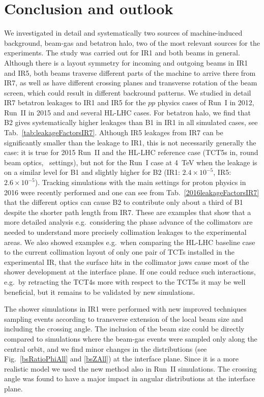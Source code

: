 \section{Conclusion and outlook~\label{last}}

We investigated in detail and systematically two sources of machine-induced background, beam-gas and betatron halo, two of the most relevant sources for the experiments. The study was carried out for IR1 and both beams in general. Although there is a layout symmetry for incoming and outgoing beams in IR1 and IR5, both beams traverse different parts of the machine to arrive there from IR7, as well as have different crossing planes and transverse rotation of the beam screen, which could result in different backround patterns. We studied in detail IR7 betatron leakages to IR1 and IR5 for the $pp$ physics cases of Run~I in 2012, Run~II in 2015 and and several HL-LHC cases. For betatron halo, we find that B2 gives systematically higher leakages than B1 in IR1 in all simulated cases, see Tab.~\ref{tab:leakageFactorsIR7}. Although IR5 leakages from IR7 can be significantly smaller than the leakage to IR1, this is not necessarily generally the case: it is true for 2015 Run~II and the HL-LHC reference case (TCT5s in, round beam optics, \twosigmaret~settings), but not for the Run~I case at 4~TeV when the leakage is on a similar level for B1 and slightly higher for B2 (IR1: $2.4 \times 10^{-5}$, IR5: $2.6 \times 10^{-5}$). Tracking simulations with the main settings for proton physics in 2016 were recently performed and one can see from Tab.~\ref{2016leakageFactorsIR7} that the different optics can cause B2 to contribute only about a third of B1 despite the shorter path length from IR7. These are examples that show that a more detailed analysis e.g.~considering the phase advance of the collimators are needed to understand more precisely collimation leakages to the experimental areas. We also showed examples e.g.~when comparing the HL-LHC baseline case to the current collimation layout of only one pair of TCTs installed in the experimental IR, that the surface hits in the collimator jaws cause most of the shower development at the interface plane. If one could reduce such interactions, e.g.~by retracting the TCT4s more with respect to the TCT5s it may be well beneficial, but it remains to be validated by new simulations.

The shower simulations in IR1 were performed with new improved techniques sampling events according to transverse extension of the local beam size and including the crossing angle. The inclusion of the beam size could be directly compared to simulations where the beam-gas events were sampled only along the central orbit, and we find minor changes in the distributions (see Fig.~\ref{bsRatioPhiAll} and \ref{bsZAll}) at the interface plane. Since it is a more realistic model we used the new method also in Run~II simulations. The crossing angle was found to have a major impact in angular distributions at the interface plane.


